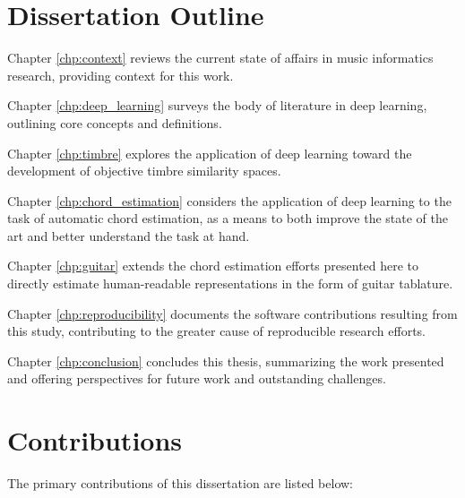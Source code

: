 \section{Dissertation Outline}
\label{sec:outline}
\begin{description}

\item Chapter \ref{chp:context} reviews the current state of affairs in music informatics research, providing context for this work.

\item Chapter \ref{chp:deep_learning} surveys the body of literature in deep learning, outlining core concepts and definitions.

\item Chapter \ref{chp:timbre} explores the application of deep learning toward the development of objective timbre similarity spaces.

\item Chapter \ref{chp:chord_estimation} considers the application of deep learning to the task of automatic chord estimation, as a means to both improve the state of the art and better understand the task at hand.

\item Chapter \ref{chp:guitar} extends the chord estimation efforts presented here to directly estimate human-readable representations in the form of guitar tablature.

\item Chapter \ref{chp:reproducibility} documents the software contributions resulting from this study, contributing to the greater cause of reproducible research efforts.

\item Chapter \ref{chp:conclusion} concludes this thesis, summarizing the work presented and offering perspectives for future work and outstanding challenges.

\end{description}

\section{Contributions}
The primary contributions of this dissertation are listed below:

